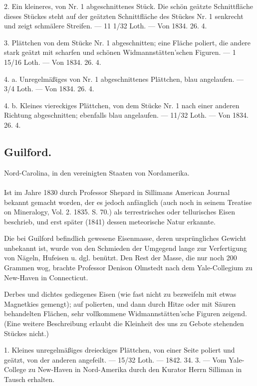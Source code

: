 \documentclass[a4paper, 11pt, oneside, polutonikogreek, german]{article}
\begin{document}
2. Ein kleineres, von Nr. 1 abgeschnittenes Stück. Die schön geätzte Schnittfläche dieses Stückes steht auf der geätzten Schnittfläche des Stückes Nr. 1 senkrecht und zeigt schmälere Streifen. — 11 1/32 Loth. — Von 1834. 26. 4.

3. Plättchen von dem Stücke Nr. 1 abgeschnitten; eine Fläche poliert, die andere stark geätzt mit scharfen und schönen Widmannstätten'schen Figuren. — 1 15/16 Loth. — Von 1834. 26. 4.

4. a. Unregelmäßiges von Nr. 1 abgeschnittenes Plättchen, blau angelaufen. — 3/4 Loth. — Von 1834. 26. 4.

4. b. Kleines viereckiges Plättchen, von dem Stücke Nr. 1 nach einer anderen Richtung abgeschnitten; ebenfalls blau angelaufen. — 11/32 Loth. — Von 1834. 26. 4.
\subsection{Guilford.}
\begin{center}
\small
Nord-Carolina, in den vereinigten Staaten von Nordamerika.
\end{center}
\paragraph{}
Ist im Jahre 1830 durch Professor Shepard in Sillimans American Journal bekannt gemacht worden, der es jedoch anfänglich (auch noch in seinem Treatise on Mineralogy, Vol. 2. 1835. S. 70.) als terrestrisches oder tellurisches Eisen beschrieb, und erst später (1841) dessen meteorische Natur erkannte.

Die bei Guilford befindlich gewesene Eisenmasse, deren ursprüngliches Gewicht unbekannt ist, wurde von den Schmieden der Umgegend lange zur Verfertigung von Nägeln, Hufeisen u. dgl. benützt. Den Rest der Masse, die nur noch 200 Grammen wog, brachte Professor Denison Olmstedt nach dem Yale-Collegium zu New-Haven in Connecticut.

Derbes und dichtes gediegenes Eisen (wie fast nicht zu bezweifeln mit etwas Magnetkies gemengt); auf polierten, und dann durch Hitze oder mit Säuren behandelten Flächen, sehr vollkommene Widmannstätten'sche Figuren zeigend. (Eine weitere Beschreibung erlaubt die Kleinheit des uns zu Gebote stehenden Stückes nicht.)

1. Kleines unregelmäßiges dreieckiges Plättchen, von einer Seite poliert und geätzt, von der anderen angefeilt. — 15/32 Loth. — 1842. 34. 3. — Vom Yale-College zu New-Haven in Nord-Amerika durch den Kurator Herrn Silliman in Tausch erhalten.
\end{document}
